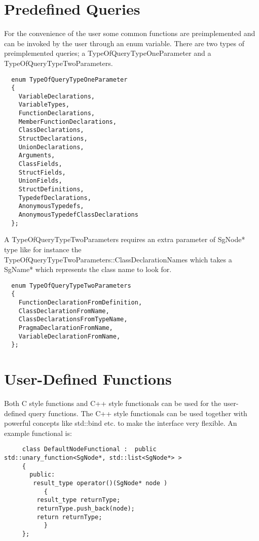\section{Predefined Queries}

For the convenience of the user some common functions are preimplemented and
can be invoked by the user through an enum variable. There are two types of
preimplemented queries; a TypeOfQueryTypeOneParameter and a
TypeOfQueryTypeTwoParameters. 

{\mySmallFontSize
\begin{verbatim}
  enum TypeOfQueryTypeOneParameter
  {
    VariableDeclarations,
    VariableTypes,
    FunctionDeclarations,
    MemberFunctionDeclarations,
    ClassDeclarations,
    StructDeclarations,
    UnionDeclarations,
    Arguments,
    ClassFields,
    StructFields,
    UnionFields,
    StructDefinitions,
    TypedefDeclarations,
    AnonymousTypedefs,
    AnonymousTypedefClassDeclarations
  };
\end{verbatim}
}

A TypeOfQueryTypeTwoParameters requires an
extra parameter of SgNode* type like for instance the
TypeOfQueryTypeTwoParameters::ClassDeclarationNames which takes a SgName*
which represents the class name to look for.

{\mySmallFontSize
\begin{verbatim}
  enum TypeOfQueryTypeTwoParameters
  {
    FunctionDeclarationFromDefinition,
    ClassDeclarationFromName,
    ClassDeclarationsFromTypeName,
    PragmaDeclarationFromName,
    VariableDeclarationFromName,
  };
\end{verbatim}
}





\section{User-Defined Functions}

Both C style functions and C++ style functionals can be used for the
user-defined query functions. The C++ style functionals can be used together
with powerful concepts like std::bind etc. to make the interface very 
flexible. An example functional is:

{\mySmallFontSize
\begin{verbatim}
     class DefaultNodeFunctional :  public std::unary_function<SgNode*, std::list<SgNode*> > 
     {
       public:
	    result_type operator()(SgNode* node ) 
	       { 
		 result_type returnType;
		 returnType.push_back(node);
		 return returnType; 
	       }
     };
\end{verbatim}
}


